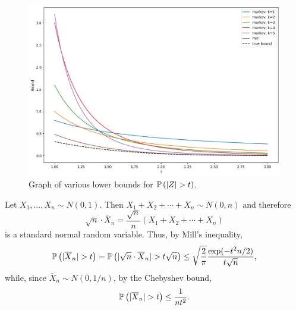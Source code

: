 \begin{ex}
  \inputminted{python}{../code/04-06.py}

  \begin{figure}[H]
    \centering
    \includegraphics[scale=0.6]{../images/04-06}
    \caption{Graph of various lower bounds for $\P{|Z|>t}$.}
  \end{figure}
\end{ex}

\begin{ex}
  Let $X_1,\ldots,X_n\sim N(0,1)$. Then $X_1+X_2+\cdots+X_n\sim N(0, n)$ and
  therefore
  \[
    \sqrt{n}\cdot \overline{X}_n=\frac{\sqrt{n}}{n}\left(X_1+X_2+\cdots+X_n\right)
  \]
  is a standard normal random variable. Thus, by Mill's inequality,
  \[
    \P{|\overline{X}_n|>t}
    =\P{|\sqrt{n}\cdot \overline{X}_n|>t\sqrt{n}}\leq \sqrt{\frac{2}{\pi}}\frac{\exp(-t^2n/2)}{t\sqrt{n}},
  \]
  while, since $\overline{X}_n\sim N(0,1/n)$, by the Chebyshev bound,
  \[
    \P{|\overline{X}_n|>t}\leq \frac{1}{nt^2}.
  \]
\end{ex}